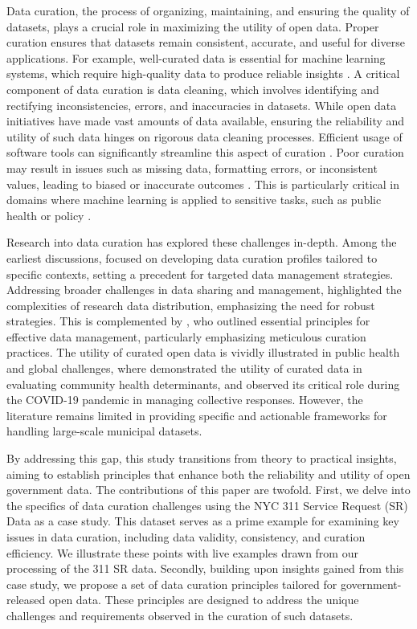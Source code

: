 \documentclass[linenumber]{jdsart}
\begin{document}
Data curation, the process of organizing, maintaining, and ensuring
the quality of datasets, plays a crucial role in maximizing the
utility of open data. Proper curation ensures that datasets remain
consistent, accurate, and useful for diverse applications. For example, 
well-curated data is essential for machine learning systems, which 
require high-quality data to produce reliable insights 
\citep{polyzotis2019data, jain2020overview}. A critical component of 
data curation is data cleaning, which involves identifying and rectifying 
inconsistencies, errors, and inaccuracies in datasets. While open data 
initiatives have made vast amounts of data available, ensuring the 
reliability and utility of such data hinges on rigorous data cleaning processes. 
Efficient usage of software tools can significantly streamline this 
aspect of curation \citep[e.g.,][]{cody2017cody, van2018statistical}. Poor 
curation may result in issues such as missing data, formatting errors, 
or inconsistent values, leading to biased or inaccurate outcomes 
\citep{geiger2020garbage}. This is particularly critical in domains 
where machine learning is applied to sensitive tasks, such as public 
health or policy \citep{rahm2000data}.


Research into data curation has explored these challenges in-depth. 
Among the earliest discussions, \citet{witt2009constructing} focused 
on developing data curation profiles tailored to specific contexts, 
setting a precedent for targeted data management strategies. 
Addressing broader challenges in data sharing and management, 
\citet{borgman2012conundrum} highlighted the complexities of 
research data distribution, emphasizing the need for robust 
strategies. This is complemented by \citet{hart2016ten}, who outlined 
essential principles for effective data management, particularly 
emphasizing meticulous curation practices. The utility of curated 
open data is vividly illustrated in public health and global challenges, 
where \citet{cantor2018facets} demonstrated the utility of curated 
data in evaluating community health determinants, and 
\citet{shankar2021data} observed its critical role during the 
COVID-19 pandemic in managing collective responses.
However, the literature remains limited in providing specific and
actionable frameworks for handling large-scale municipal datasets.


By addressing this gap, this study transitions from theory to
practical insights, aiming to establish principles that enhance both
the reliability and utility of open government data.
The contributions of this paper are twofold. First, we delve into
the specifics of data curation challenges using the NYC 311 Service
Request (SR) Data as a case study. This dataset serves as a prime 
example for examining key issues in data curation, including data 
validity, consistency, and curation efficiency. We illustrate these 
points with live examples drawn from our 
processing of the 311 SR data. Secondly, building upon insights 
gained from this case study, we propose a set of data curation 
principles tailored for government-released open data. These 
principles are designed to address the unique challenges 
and requirements observed in the curation of such datasets.
\end{document}
